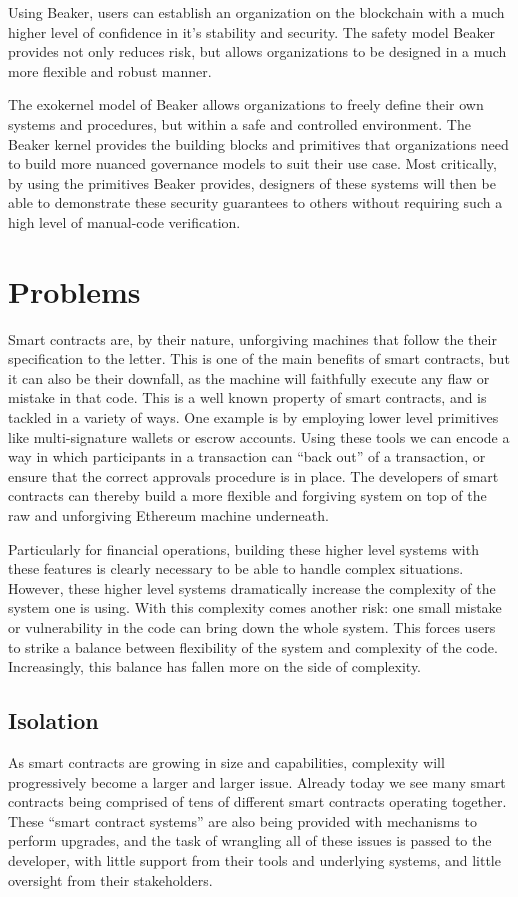 \documentclass[english,a4paper]{article}
\begin{document}
Using Beaker, users can establish an organization on the blockchain with
a much higher level of confidence in it's stability and security. The
safety model Beaker provides not only reduces risk, but allows
organizations to be designed in a much more flexible and robust manner.

The exokernel model of Beaker allows organizations to freely define
their own systems and procedures, but within a safe and controlled
environment. The Beaker kernel provides the building blocks and
primitives that organizations need to build more nuanced governance
models to suit their use case. Most critically, by using the primitives
Beaker provides, designers of these systems will then be able to
demonstrate these security guarantees to others without requiring such a high
level of manual-code verification.

\section{Problems}\label{problems}
Smart contracts are, by their nature, unforgiving machines that follow the their
specification to the letter. This is one of the main benefits of smart
contracts, but it can also be their downfall, as the machine will faithfully
execute any flaw or mistake in that code. This is a well known property of smart
contracts, and is tackled in a variety of ways. One example is by employing
lower level primitives like multi-signature wallets or escrow accounts. Using
these tools we can encode a way in which participants in a transaction can
``back out'' of a transaction, or ensure that the correct approvals procedure is
in place. The developers of smart contracts can thereby build a more flexible
and forgiving system on top of the raw and unforgiving Ethereum machine
underneath.

Particularly for financial operations, building these higher level systems with
these features is clearly necessary to be able to handle complex situations.
However, these higher level systems dramatically increase the complexity of the
system one is using. With this complexity comes another risk: one small mistake
or vulnerability in the code can bring down the whole system. This forces users
to strike a balance between flexibility of the system and complexity of the
code. Increasingly, this balance has fallen more on the side of complexity.

\subsection{Isolation}\label{isolation}
As smart contracts are growing in size and capabilities, complexity will
progressively become a larger and larger issue. Already today we see many smart
contracts being comprised of tens of different smart contracts operating
together. These ``smart contract systems'' are also being provided with
mechanisms to perform upgrades, and the task of wrangling all of these issues is
passed to the developer, with little support from their tools and underlying
systems, and little oversight from their stakeholders.
\end{document}
